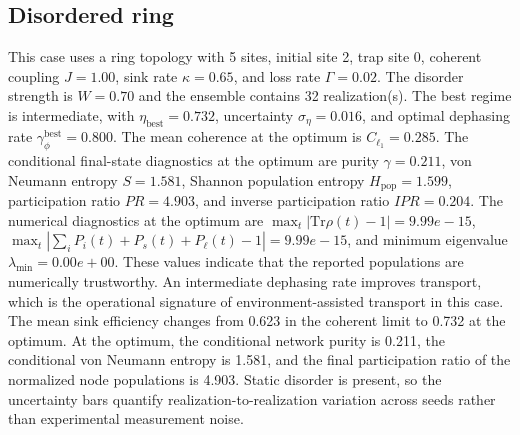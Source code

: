 \subsection{Disordered ring}
This case uses a ring topology with 5 sites, initial site 2, trap site 0, coherent coupling $J=1.00$, sink rate $\kappa=0.65$, and loss rate $\Gamma=0.02$. The disorder strength is $W=0.70$ and the ensemble contains 32 realization(s).
The best regime is intermediate, with $\eta_{\mathrm{best}}=0.732$, uncertainty $\sigma_\eta=0.016$, and optimal dephasing rate $\gamma_\phi^{\mathrm{best}}=0.800$. The mean coherence at the optimum is $C_{\ell_1}=0.285$.
The conditional final-state diagnostics at the optimum are purity $\gamma=0.211$, von Neumann entropy $S=1.581$, Shannon population entropy $H_\mathrm{pop}=1.599$, participation ratio $PR=4.903$, and inverse participation ratio $IPR=0.204$.
The numerical diagnostics at the optimum are $\max_t |\mathrm{Tr}\rho(t)-1|=9.99e-15$, $\max_t |\sum_i P_i(t)+P_s(t)+P_\ell(t)-1|=9.99e-15$, and minimum eigenvalue $\lambda_\mathrm{min}=0.00e+00$. These values indicate that the reported populations are numerically trustworthy.
An intermediate dephasing rate improves transport, which is the operational signature of environment-assisted transport in this case. The mean sink efficiency changes from 0.623 in the coherent limit to 0.732 at the optimum. At the optimum, the conditional network purity is 0.211, the conditional von Neumann entropy is 1.581, and the final participation ratio of the normalized node populations is 4.903. Static disorder is present, so the uncertainty bars quantify realization-to-realization variation across seeds rather than experimental measurement noise.


